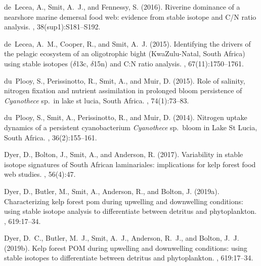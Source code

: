\begin{thebibliography}{}
  de~Lecea, A., Smit, A.~J., and Fennessy, S. (2016).
  \newblock Riverine dominance of a nearshore marine demersal food web: evidence
    from stable isotope and {C}/{N} ratio analysis.
  , 38(sup1):S181--S192.
  
  de~Lecea, A.~M., Cooper, R., and Smit, A.~J. (2015).
  \newblock Identifying the drivers of the pelagic ecosystem of an oligotrophic
    bight ({K}wa{Z}ulu-{N}atal, {S}outh {A}frica) using stable isotopes
    ($\delta$13c, $\delta$15n) and {C}:{N} ratio analysis.
  , 67(11):1750--1761.
  
  du~Plooy, S., Perissinotto, R., Smit, A., and Muir, D. (2015).
  \newblock Role of salinity, nitrogen fixation and nutrient assimilation in
    prolonged bloom persistence of \emph{Cyanothece} sp.~in lake st lucia,
    {S}outh {A}frica.
  , 74(1):73--83.
  
  du~Plooy, S., Smit, A., Perissinotto, R., and Muir, D. (2014).
  \newblock Nitrogen uptake dynamics of a persistent cyanobacterium
    \emph{Cyanothece} sp.~bloom in {L}ake {S}t {L}ucia, {S}outh {A}frica.
  , 36(2):155--161.
  
  Dyer, D., Bolton, J., Smit, A., and Anderson, R. (2017).
  \newblock Variability in stable isotope signatures of {S}outh {A}frican
    laminariales: implications for kelp forest food web studies.
  , 56(4):47.
  
  Dyer, D., Butler, M., Smit, A., Anderson, R., and Bolton, J. (2019a).
  \newblock Characterizing kelp forest pom during upwelling and downwelling
    conditions: using stable isotope analysis to differentiate between detritus
    and phytoplankton.
  , 619:17--34.
  
  Dyer, D.~C., Butler, M.~J., Smit, A.~J., Anderson, R.~J., and Bolton, J.~J.
    (2019b).
  \newblock Kelp forest {POM} during upwelling and downwelling conditions: using
    stable isotopes to differentiate between detritus and phytoplankton.
  , 619:17--34.
  

\end{thebibliography}
